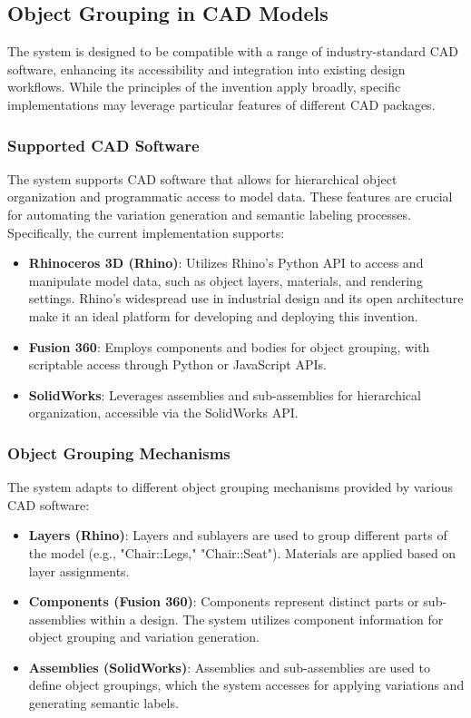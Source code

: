 \documentclass{article}
\begin{document}
\subsection{Object Grouping in CAD Models}

The system is designed to be compatible with a range of industry-standard CAD software, enhancing its accessibility and integration into existing design workflows. While the principles of the invention apply broadly, specific implementations may leverage particular features of different CAD packages.

\subsubsection{Supported CAD Software}

The system supports CAD software that allows for hierarchical object organization and programmatic access to model data. These features are crucial for automating the variation generation and semantic labeling processes. Specifically, the current implementation supports:

\begin{itemize}
    \item \textbf{Rhinoceros 3D (Rhino)}: Utilizes Rhino's Python API to access and manipulate model data, such as object layers, materials, and rendering settings. Rhino’s widespread use in industrial design and its open architecture make it an ideal platform for developing and deploying this invention.
    \item \textbf{Fusion 360}: Employs components and bodies for object grouping, with scriptable access through Python or JavaScript APIs.
    \item \textbf{SolidWorks}: Leverages assemblies and sub-assemblies for hierarchical organization, accessible via the SolidWorks API.
\end{itemize}

\subsubsection{Object Grouping Mechanisms}

The system adapts to different object grouping mechanisms provided by various CAD software:

\begin{itemize}
    \item \textbf{Layers (Rhino)}: Layers and sublayers are used to group different parts of the model (e.g., "Chair::Legs," "Chair::Seat"). Materials are applied based on layer assignments.
    \item \textbf{Components (Fusion 360)}: Components represent distinct parts or sub-assemblies within a design. The system utilizes component information for object grouping and variation generation.
    \item \textbf{Assemblies (SolidWorks)}: Assemblies and sub-assemblies are used to define object groupings, which the system accesses for applying variations and generating semantic labels.
\end{itemize}
\end{document}
